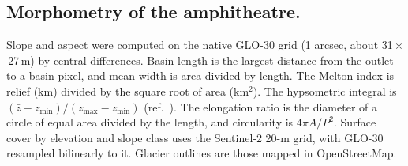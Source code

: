 \documentclass{nature}
\begin{document}
\begin{methods}
\subsection{Morphometry of the amphitheatre.}
Slope and aspect were computed on the native GLO-30 grid (1 arcsec, about 31\,$\times$\,27\,m) by central differences. Basin length is the largest distance from the outlet to a basin pixel, and mean width is area divided by length. The Melton index is relief (km) divided by the square root of area (km$^{2}$)\cite{melton1965}. The hypsometric integral is $(\bar z-z_\mathrm{min})/(z_\mathrm{max}-z_\mathrm{min})$ (ref.~). The elongation ratio is the diameter of a circle of equal area divided by the length, and circularity is $4\pi A/P^{2}$. Surface cover by elevation and slope class uses the Sentinel-2 20-m grid, with GLO-30 resampled bilinearly to it. Glacier outlines are those mapped in OpenStreetMap\cite{osm2026}.


\end{methods}
\end{document}
